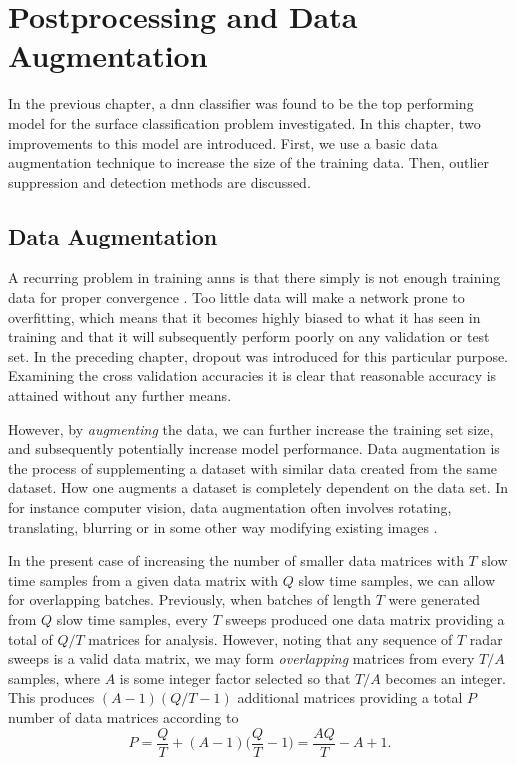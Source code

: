 \chapter{Postprocessing and Data Augmentation}

In the previous chapter, a \gls{dnn} classifier was found to be the top performing model for the surface classification problem investigated. In this chapter, two improvements to this model are introduced. First, we use a basic data augmentation technique to increase the size of the training data. Then, outlier suppression and detection methods are discussed.

\section{Data Augmentation}

A recurring problem in training \gls{ann}s is that there simply is not enough training data for proper convergence \citep{lemley_bazrafkan_corcoran_2017}. Too little data will make a network prone to overfitting, which means that it becomes highly biased to what it has seen in training and that it will subsequently perform poorly on any validation or test set. In the preceding chapter, dropout was introduced for this particular purpose. Examining the cross validation accuracies it is clear that reasonable accuracy is attained without any further means.

However, by \emph{augmenting} the data, we can further increase the training set size, and subsequently potentially increase model performance. Data augmentation is the process of supplementing a dataset with similar data created from the same dataset. How one augments a dataset is completely dependent on the data set. In for instance computer vision, data augmentation often involves rotating, translating, blurring or in some other way modifying existing images \citep{lemley_bazrafkan_corcoran_2017}.

In the present case of increasing the number of smaller data matrices with $T$ slow time samples from a given data matrix with $Q$ slow time samples, we can allow for overlapping batches. Previously, when batches of length $T$ were generated from $Q$ slow time samples, every $T$ sweeps produced one data matrix providing a total of $Q/T$ matrices for analysis. However, noting that any sequence of $T$ radar sweeps is a valid data matrix, we may form \emph{overlapping} matrices from every $T/A$ samples, where $A$ is some integer factor selected so that $T/A$ becomes an integer. This produces $(A-1)(Q/T-1)$ additional matrices providing a total $P$ number of data matrices according to
\begin{equation}
	P = 
	\frac{Q}{T} + (A-1)\Big(\frac{Q}{T} - 1\Big) = 
	\frac{AQ}{T}-A+1.
\end{equation}

